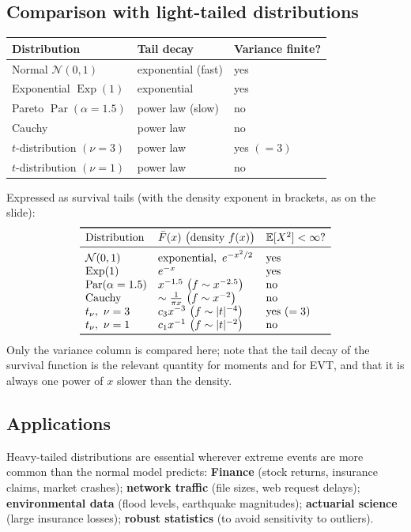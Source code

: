 \documentclass[11pt,a4paper]{article}
\newcommand{\Par}{\operatorname{Par}}
\newcommand{\Exp}{\operatorname{Exp}}
\newcommand{\E}{\mathbb{E}}
\newcommand{\N}{\mathcal{N}}
\begin{document}
\subsection{Comparison with light-tailed distributions}
\begin{center}
\begin{tabular}{lll}
\toprule
Distribution & Tail decay & Variance finite?\\
\midrule
Normal $\N(0,1)$ & exponential (fast) & yes\\
Exponential $\Exp(1)$ & exponential & yes\\
Pareto $\Par(\alpha=1.5)$ & power law (slow) & no\\
Cauchy & power law & no\\
$t$-distribution $(\nu=3)$ & power law & yes $(=3)$\\
$t$-distribution $(\nu=1)$ & power law & no\\
\bottomrule
\end{tabular}
\end{center}
Expressed as survival tails (with the density exponent in brackets, as on the slide):
\[
\begin{array}{lll}
\toprule
\text{Distribution} & \bar F(x)\ \big(\text{density }f(x)\big) & \E[X^2]<\infty?\\
\midrule
\N(0,1) & \text{exponential},\ e^{-x^2/2} & \text{yes}\\
\Exp(1) & e^{-x} & \text{yes}\\
\Par(\alpha=1.5) & x^{-1.5}\ \big(f\sim x^{-2.5}\big) & \text{no}\\
\text{Cauchy} & \sim \frac{1}{\pi x}\ \big(f\sim x^{-2}\big) & \text{no}\\
t_\nu,\ \nu=3 & c_3x^{-3}\ \big(f\sim|t|^{-4}\big) & \text{yes }(=3)\\
t_\nu,\ \nu=1 & c_1x^{-1}\ \big(f\sim|t|^{-2}\big) & \text{no}\\
\bottomrule
\end{array}
\]
Only the variance column is compared here; note that the tail decay of the survival function is the
relevant quantity for moments and for EVT, and that it is always one power of $x$ slower than the
density.

\subsection{Applications}
Heavy-tailed distributions are essential wherever extreme events are more common than the normal
model predicts:
\textbf{Finance} (stock returns, insurance claims, market crashes);
\textbf{network traffic} (file sizes, web request delays);
\textbf{environmental data} (flood levels, earthquake magnitudes);
\textbf{actuarial science} (large insurance losses);
\textbf{robust statistics} (to avoid sensitivity to outliers).
\end{document}
